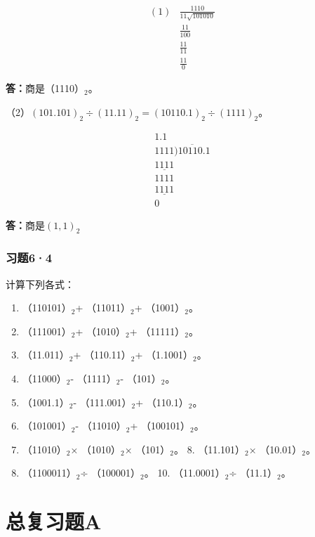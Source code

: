 \[
\begin{array}{rl} (1) & \frac{1110}{11 \sqrt {101010}} \\ & \frac{11}{100} \\ & \frac{11}{11} \\ & \frac{11}{0} \end{array}
\]

\textbf{答：}商是（1110）\(_{2}\)。

（2）\((101.101)_2 \div (11.11)_2 = (10110.1)_2 \div (1111)_2\)。

\[
\begin{array}{r} 1.1 \\ 1111 \overline {{) 10110.1}} \\ \underline {{1111}} \\ 1111 \\ \underline {{1111}} \\ 0 \end{array}
\]

\textbf{答：}商是\((1,1)_2\)

\subsection{习题6·4}

计算下列各式：

\begin{enumerate}
\item
  （110101）\(_{2}\)+ （11011）\(_{2}\)+ （1001）\(_{2}\)。
\item
  （111001）\(_{2}\)+ （1010）\(_{2}\)+ （11111）\(_{2}\)。
\item
  （11.011）\(_{2}\)+ （110.11）\(_{2}\)+ （1.1001）\(_{2}\)。
\item
  （11000）\(_{2}\)- （1111）\(_{2}\)- （101）\(_{2}\)。
\item
  （1001.1）\(_{2}\)- （111.001）\(_{2}\)+ （110.1）\(_{2}\)。
\item
  （101001）\(_{2}\)- （11010）\(_{2}\)+ （100101）\(_{2}\)。
\item
  （11010）\(_{2}\)× （1010）\(_{2}\)× （101）\(_{2}\)。 8.
  （11.101）\(_{2}\)× （10.01）\(_{2}\)。
\item
  （1100011）\(_{2}\)÷ （100001）\(_{2}\)。 10. （11.0001）\(_{2}\)÷
  （11.1）\(_{2}\)。
\end{enumerate}

\chapter{总复习题A}

